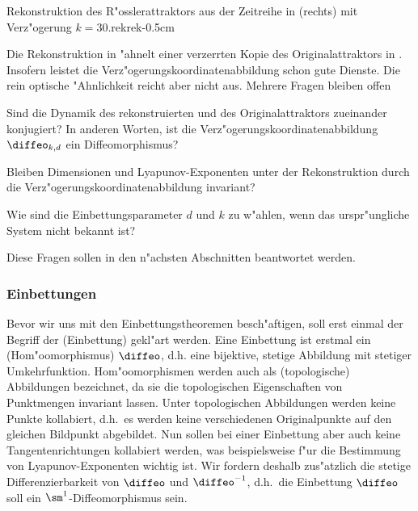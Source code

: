 {
{Rekonstruktion des R"osslerattraktors aus der Zeitreihe in  (rechts) mit 
Verz"ogerung $k=30$.}{rekrek}{-0.5cm}}

Die Rekonstruktion in  "ahnelt einer verzerrten Kopie des
Originalattraktors in . Insofern leistet die
Verz"ogerungskoordinatenabbildung schon gute Dienste. Die rein optische "Ahnlichkeit
reicht aber nicht aus. Mehrere Fragen bleiben offen
\begin{myitemize}
\item Sind die Dynamik des rekonstruierten und des Originalattraktors zueinander
konjugiert? In anderen Worten, ist die Verz"ogerungskoordinatenabbildung $\diffeo_{k,d}$
ein Diffeomorphismus?
\item Bleiben Dimensionen und Lyapunov-Exponenten unter der Rekonstruktion durch 
die Verz"ogerungskoordinatenabbildung invariant?
\item Wie sind die Einbettungsparameter $d$ und $k$ zu w"ahlen, wenn das urspr"ungliche
System nicht bekannt ist?
\end{myitemize}
Diese Fragen sollen in den n"achsten Abschnitten beantwortet werden.





\subsubsection{Einbettungen}

Bevor wir uns mit den Einbettungstheoremen besch"aftigen, soll erst einmal der Begriff der
\begriff(Einbettung) gekl"art werden. Eine Einbettung ist erstmal ein
\begriff(Hom"oomorphismus) $\diffeo$, d.h. eine bijektive, stetige Abbildung mit stetiger
Umkehrfunktion. Hom"oomorphismen werden auch als \begriff(topologische) Abbildungen
bezeichnet, da sie die topologischen Eigenschaften von Punktmengen invariant lassen.
Unter topologischen Abbildungen werden keine Punkte kollabiert, d.h.\  es werden keine
verschiedenen Originalpunkte auf den gleichen Bildpunkt abgebildet. Nun sollen bei einer
Einbettung aber auch keine Tangentenrichtungen kollabiert werden, was beispielsweise f"ur die
Bestimmung von Lyapunov-Exponenten wichtig ist. Wir fordern deshalb
zus"atzlich die stetige Differenzierbarkeit von $\diffeo$ und $\diffeo^{-1}$,
d.h.\ die Einbettung $\diffeo$ soll ein $\sm^1$-Diffeomorphismus sein.

